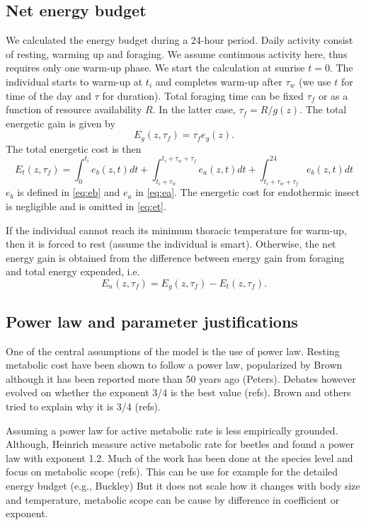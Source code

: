 \subsection*{Net energy budget}
We calculated  the energy budget during a 24-hour period.
Daily activity consist of resting, warming up and foraging.
We assume continuous activity here, thus requires only one warm-up phase.
We start the calculation at sunrise $t = 0$.
The individual starts to warm-up at $t_i$ and completes warm-up after $\tau_w$ (we use $t$ for time of the day and $\tau$ for duration).
Total foraging time can be fixed $\tau_f$ or as a function of resource availability $R$. 
In the latter case, $\tau_f = R/g(z)$.
The total energetic gain is given by
\[
	E_g(z,\tau_f) = \tau_f e_g(z).
\]
%
The total energetic cost is then
\begin{equation} \label{eq:et}
	E_t(z, \tau_f) = \int_0^{t_i} e_b(z, t) dt + \int_{t_i + \tau_w}^{t_i +\tau_w + \tau_f} e_a(z,t) dt + \int_{t_i+\tau_w+\tau_f}^{24} e_b(z, t) dt 
\end{equation}
$e_b$ is defined in \cref{eq:eb}  and $e_a$ in \cref{eq:ea}.
The energetic cost for endothermic insect is negligible and is omitted in \cref{eq:et}.

If the individual cannot reach its minimum thoracic temperature for warm-up, then it is forced to rest (assume the individual is smart).
Otherwise, the net energy gain is obtained from the  difference between energy gain from foraging and total energy expended, i.e.
\[ 
	E_n(z, \tau_f) = E_g(z,\tau_f) - E_t(z, \tau_f).
\]

\subsection*{Power law and parameter justifications}
One of the central assumptions of the model is the use of power law.
Resting metabolic cost have been shown to follow a power law, popularized by Brown although it has been reported more than 50 years ago (Peters).
Debates however evolved on whether the exponent 3/4 is the best value (refs).
Brown and others tried to explain why it is 3/4 (refs).

Assuming a power law for active metabolic rate is less empirically grounded.
Although, Heinrich measure active metabolic rate for beetles and found a power law with exponent 1.2.
Much of the work has been done at the  species level and focus on metabolic scope (refs).
This can be use for example for the detailed energy budget (e.g., Buckley)
But it does not scale how it changes with body size and temperature, metabolic scope can be cause by difference in coefficient or exponent.

